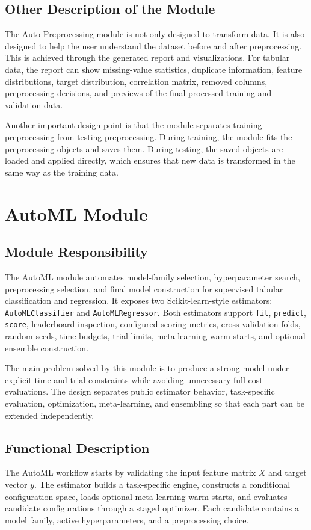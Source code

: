 \documentclass[12pt,a4paper]{report}
\begin{document}
\subsection{Other Description of the Module}
\noindent The Auto Preprocessing module is not only designed to transform data. It is also
designed to help the user understand the dataset before and after
preprocessing. This is achieved through the generated report and visualizations.
For tabular data, the report can show missing-value statistics, duplicate
information, feature distributions, target distribution, correlation matrix,
removed columns, preprocessing decisions, and previews of the final processed
training and validation data.

\noindent Another important design point is that the module separates training
preprocessing from testing preprocessing. During training, the module fits the
preprocessing objects and saves them. During testing, the saved objects are
loaded and applied directly, which ensures that new data is transformed in the
same way as the training data.


\section{AutoML Module}
\subsection{Module Responsibility}
The AutoML module automates model-family selection, hyperparameter search,
preprocessing selection, and final model construction for supervised tabular
classification and regression. It exposes two Scikit-learn-style estimators:
\texttt{AutoMLClassifier} and \texttt{AutoMLRegressor}. Both estimators support
\texttt{fit}, \texttt{predict}, \texttt{score}, leaderboard inspection,
configured scoring metrics, cross-validation folds, random seeds, time budgets,
trial limits, meta-learning warm starts, and optional ensemble construction.

The main problem solved by this module is to produce a strong model under
explicit time and trial constraints while avoiding unnecessary full-cost
evaluations. The design separates public estimator behavior, task-specific
evaluation, optimization, meta-learning, and ensembling so that each part can be
extended independently.

\subsection{Functional Description}
The AutoML workflow starts by validating the input feature matrix $X$ and target
vector $y$. The estimator builds a task-specific engine, constructs a
conditional configuration space, loads optional meta-learning warm starts, and
evaluates candidate configurations through a staged optimizer. Each candidate
contains a model family, active hyperparameters, and a preprocessing choice.
\end{document}
